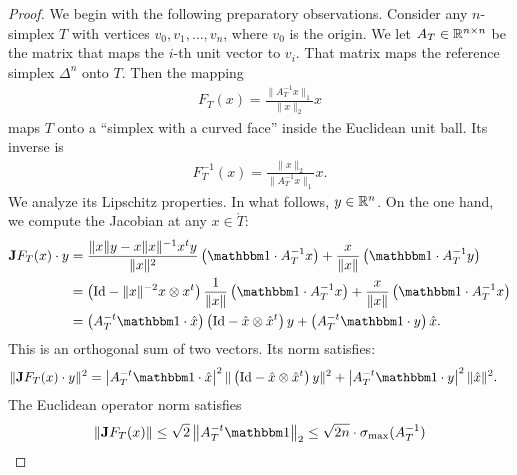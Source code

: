 \documentclass[10pt,a4paper]{article}
\begin{document}
\begin{proof}
    We begin with the following preparatory observations. 
    Consider any $n$-simplex $T$ with vertices $v_0, v_1, \dots, v_n$, where $v_0$ is the origin. 
    We let $A_{T} \in {\mathbb R}^{n \times n}$ be the matrix that maps the $i$-th unit vector to $v_i$.
    That matrix maps the reference simplex $\Delta^{n}$ onto $T$. 
    Then the mapping 
    \begin{align}
        F_T(x) 
        = 
        \frac{ \| A_{T}^{-1} x \|_{1} }{ \|x\|_2 } x
    \end{align}
    maps $T$ onto a ``simplex with a curved face'' inside the Euclidean unit ball. Its inverse is
    \begin{align}
        F_T^{-1}(x) 
        = 
        \frac{ \|x\|_2 }{ \| A_{T}^{-1} x \|_{1} } x
        .
    \end{align}
    We analyze its Lipschitz properties.
    In what follows, $y \in {\mathbb R}^{n}$. 
    On the one hand, 
    we compute the Jacobian at any $x \in \mathring T$:
    \begin{align*}
        \Jacobian F_T(x) \cdot y
        &= 
        \frac{ \|x\| y - x \|x\|^{-1} x^t y }{\|x\|^2} 
        \left( \vecone \cdot A_{T}^{-1} x \right)
        + 
        \frac{x}{\|x\|} \left( \vecone \cdot A_{T}^{-1} y \right)
        \\&= 
        \left( \Id - \|x\|^{-2} x \otimes x^t \right)
        \frac{ 1 }{ \|x\| } 
        \left( \vecone \cdot A_{T}^{-1} x \right)
        + 
        \frac{x}{\|x\|} \left( \vecone \cdot A_{T}^{-1} x \right)
        \\&= 
        \left( A_{T}^{-t} \vecone \cdot \hat x \right)
        \left( \Id - \hat x \otimes \hat x^t \right) y
        + 
        \left( A_{T}^{-t} \vecone \cdot y \right) \hat x 
        .
    \end{align*}
    This is an orthogonal sum of two vectors. Its norm satisfies:
\begin{align*}
        \| \Jacobian F_T(x) \cdot y \|^{2}
        &= 
        \left| A_{T}^{-t} \vecone \cdot \hat x \right|^{2}
        \| \left( \Id - \hat x \otimes \hat x^t \right) y \|^{2}
        + 
        \left| A_{T}^{-t} \vecone \cdot y \right|^{2} \| \hat x \|^{2}
        .
    \end{align*}
    The Euclidean operator norm satisfies 
    \begin{align*}
        \| \Jacobian F_T(x) \| 
        \leq 
        \sqrt 2 \left\| A_{T}^{-t} \vecone \right\|_{2}
        \leq 
        \sqrt{2n} \cdot \sigma_{\max}(A_{T}^{-1}) 

\end{align*}
\end{proof}
\end{document}
